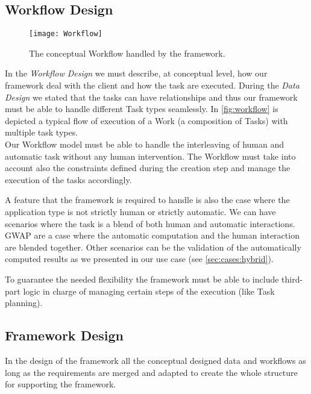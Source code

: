 \subsection{Workflow Design}\label{design:work}
\begin{figure}[htb]
    \centering
    \texttt{[image: Workflow]}
    \caption{The conceptual Workflow handled by the framework.}
    \label{fig:workflow}
\end{figure}
In the \emph{Workflow Design} we must describe, at conceptual level, how our
framework deal with the client and how the task are executed. During the
\emph{Data Design} we stated that the tasks can have relationships and thus our
framework must be able to handle different Task types seamlessly. In
\autoref{fig:workflow} is depicted a typical flow of execution of a Work (a
composition of Tasks) with multiple task types.\\

Our Workflow model must be able to handle the interleaving of human and automatic
task without any human intervention. The Workflow must take into account also the
constraints defined during the creation step and manage the execution of the
tasks accordingly.

A feature that the framework is required to handle is also the case where
the application type is not strictly human or strictly automatic. We can have
scenarios where the task is a blend of both human and automatic interactions.
\ac{GWAP} are a case where the automatic computation and the human interaction
are blended together. Other scenarios can be the validation of the automatically
computed results as we presented in our use case (see \ref{sec:cases:hybrid}).

To guarantee the needed flexibility the framework must be able to include third-part
logic in charge of managing certain steps of the execution (like Task planning).




\subsection{Framework Design}
In the design of the framework all the conceptual designed data and workflows as
long as the requirements are merged and adapted to create the whole structure for
supporting the framework.\\

